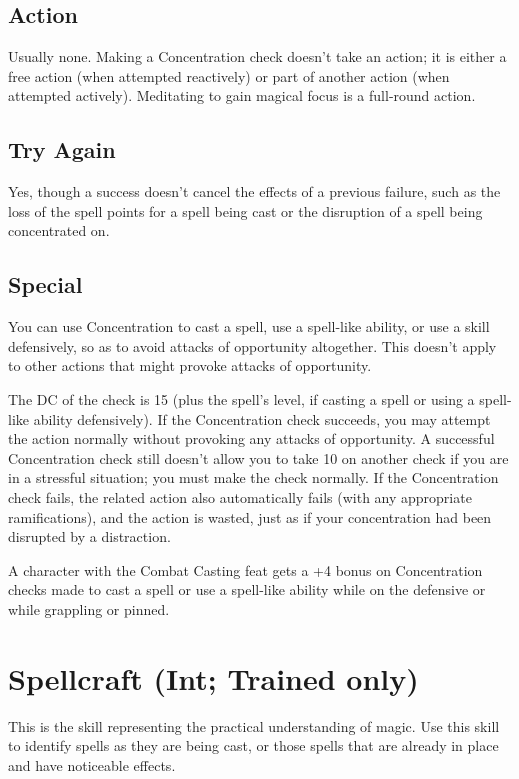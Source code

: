 \subsection{Action}
Usually none. Making a Concentration check doesn't take an action; it is either a free action (when attempted reactively) or part of another action (when attempted actively).
Meditating to gain magical focus is a full-round action. 
\subsection{Try Again}
Yes, though a success doesn't cancel the effects of a previous failure, 
such as the loss of the spell points for a spell being cast or the disruption of a spell being concentrated on. 
\subsection{Special}
You can use Concentration to cast a spell, use a spell-like ability, or use a skill defensively, so as to avoid attacks of opportunity altogether. 
This doesn't apply to other actions that might provoke attacks of opportunity.

The DC of the check is 15 (plus the spell's level, if casting a spell or using a spell-like ability defensively). 
If the Concentration check succeeds, you may attempt the action normally without provoking any attacks of opportunity. 
A successful Concentration check still doesn't allow you to take 10 on another check if you are in a stressful situation; 
you must make the check normally. If the Concentration check fails, the related action also automatically fails (with any appropriate ramifications), 
and the action is wasted, just as if your concentration had been disrupted by a distraction.

A character with the Combat Casting feat gets a +4 bonus on Concentration checks made to cast a spell or use a spell-like ability while on the defensive or while grappling or pinned.
\section[Spellcraft]{Spellcraft (Int; Trained only)}
\label{sec:Spellcraft}
This is the skill representing the practical understanding of magic.
Use this skill to identify spells as they are being cast, 
or those spells that are already in place and have noticeable effects.

